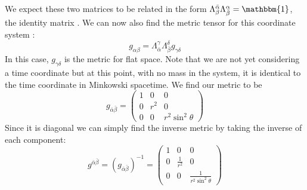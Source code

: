 \documentclass[11pt]{article}
\numberwithin{equation}{section}
\numberwithin{figure}{section}
\numberwithin{table}{section}
\begin{document}
We expect these two matrices to be related in the form $\Lambda_\beta^{\bar\alpha}\Lambda_{\bar\beta}^\alpha=\mathbbm{1}$, the identity matrix \cite{dunsby}. We can now also find the metric tensor for this coordinate system \cite{dunsby}:
\begin{equation}
    g_{\alpha\beta}=\Lambda^\gamma_{\bar\alpha}\Lambda^\delta_{\bar\beta}g_{\gamma\delta}
\end{equation}
In this case, $g_{\gamma\delta}$ is the metric for flat space. Note that we are not yet considering a time coordinate but at this point, with no mass in the system, it is identical to the time coordinate in Minkowski spacetime. We find our metric to be 
\begin{equation}
    g_{\bar\alpha\bar\beta}=
    \begin{pmatrix}
        1&0&0\\
        0&r^2&0\\
        0&0&r^2\sin^2\theta
    \end{pmatrix}
    \label{eqn:spherical polars metric}
\end{equation}
Since it is diagonal we can simply find the inverse metric by taking the inverse of each component:
\begin{equation}
    g^{\bar\alpha\bar\beta}=(g_{\bar\alpha\bar\beta})^{-1}=
    \begin{pmatrix}
        1&0&0\\
        0&\frac{1}{r^2}&0\\
        0&0&\frac{1}{r^2\sin^2\theta}
    \end{pmatrix}
    \label{eqn:spherical polars inverse metric}
\end{equation}
\end{document}
